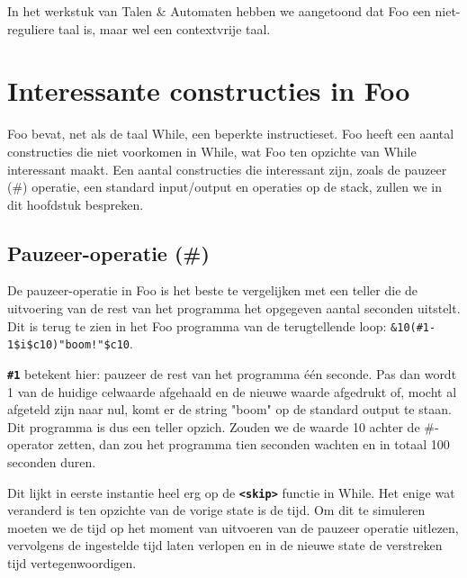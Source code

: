 \documentclass[11pt]{article}
\begin{document}
In het werkstuk van Talen \& Automaten hebben we aangetoond dat Foo een niet-reguliere taal is, maar wel een contextvrije taal.

\section{Interessante constructies in Foo}

Foo bevat, net als de taal While, een beperkte instructieset. 
Foo heeft een aantal constructies die niet voorkomen in While, wat Foo ten opzichte van While interessant maakt.
Een aantal constructies die interessant zijn, zoals de pauzeer (\#) operatie, een standard input/output en operaties op de stack, zullen we in dit hoofdstuk bespreken. %

\subsection{Pauzeer-operatie (\#)}
De pauzeer-operatie in Foo is het beste te vergelijken met een teller die de uitvoering van de rest van het programma het opgegeven aantal seconden uitstelt. 
Dit is terug te zien in het Foo programma van de terugtellende loop: \verb|&10(#1-1$i$c10)"boom!"$c10|.

{\bf \verb|#1|} betekent hier: pauzeer de rest van het programma \'e\'en seconde. 
Pas dan wordt 1 van de huidige celwaarde afgehaald en de nieuwe waarde afgedrukt of, mocht al afgeteld zijn naar nul, komt er de string "boom" op de standard output te staan.
Dit programma is dus een teller opzich.
Zouden we de waarde 10 achter de \#-operator zetten, dan zou het programma tien seconden wachten en in totaal 100 seconden duren.


Dit lijkt in eerste instantie heel erg op de {\bf\verb|<skip>|} functie in While.
Het enige wat veranderd is ten opzichte van de vorige state is de tijd.
Om dit te simuleren moeten we de tijd op het moment van uitvoeren van de pauzeer operatie uitlezen, vervolgens de ingestelde tijd laten verlopen en in de nieuwe state de verstreken tijd vertegenwoordigen.
\end{document}
